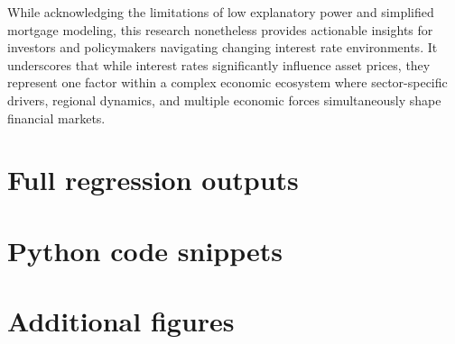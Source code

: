 \documentclass[12pt, stu, abstract]{apa7}
\begin{document}
While acknowledging the limitations of low explanatory power and simplified mortgage modeling, this research nonetheless provides actionable insights for investors and policymakers navigating changing interest rate environments. It underscores that while interest rates significantly influence asset prices, they represent one factor within a complex economic ecosystem where sector-specific drivers, regional dynamics, and multiple economic forces simultaneously shape financial markets.

\printbibliography

\begin{appendices}
\section{Full regression outputs}

\section{Python code snippets}

\section{Additional figures}
\end{appendices}
\end{document}
